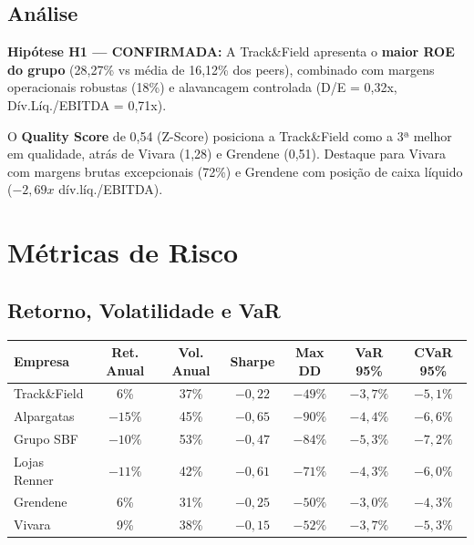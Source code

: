\documentclass[12pt, a4paper]{article}
\begin{document}
\subsection{Análise}

\textbf{Hipótese H1 --- CONFIRMADA:} A Track\&Field apresenta o \textbf{maior ROE do grupo} (28,27\% vs média de 16,12\% dos peers), combinado com margens operacionais robustas (18\%) e alavancagem controlada (D/E = 0,32x, Dív.Líq./EBITDA = 0,71x).

O \textbf{Quality Score} de 0,54 (Z-Score) posiciona a Track\&Field como a 3ª melhor em qualidade, atrás de Vivara (1,28) e Grendene (0,51). Destaque para Vivara com margens brutas excepcionais (72\%) e Grendene com posição de caixa líquido ($-2,69x$ dív.líq./EBITDA).

\section{Métricas de Risco}

\subsection{Retorno, Volatilidade e VaR}

\begin{center}
\small
\begin{tabular}{lcccccc}
\toprule
\textbf{Empresa} & \textbf{Ret. Anual} & \textbf{Vol. Anual} & \textbf{Sharpe} & \textbf{Max DD} & \textbf{VaR 95\%} & \textbf{CVaR 95\%} \\
\midrule
\rowcolor{cinzatabela}
Track\&Field & 6\% & 37\% & $-0,22$ & $-49\%$ & $-3,7\%$ & $-5,1\%$ \\
Alpargatas & $-15\%$ & 45\% & $-0,65$ & $-90\%$ & $-4,4\%$ & $-6,6\%$ \\
\rowcolor{cinzatabela}
Grupo SBF & $-10\%$ & 53\% & $-0,47$ & $-84\%$ & $-5,3\%$ & $-7,2\%$ \\
Lojas Renner & $-11\%$ & 42\% & $-0,61$ & $-71\%$ & $-4,3\%$ & $-6,0\%$ \\
\rowcolor{cinzatabela}
Grendene & 6\% & 31\% & $-0,25$ & $-50\%$ & $-3,0\%$ & $-4,3\%$ \\
Vivara & 9\% & 38\% & $-0,15$ & $-52\%$ & $-3,7\%$ & $-5,3\%$ \\
\bottomrule
\end{tabular}
\end{center}
\end{document}
